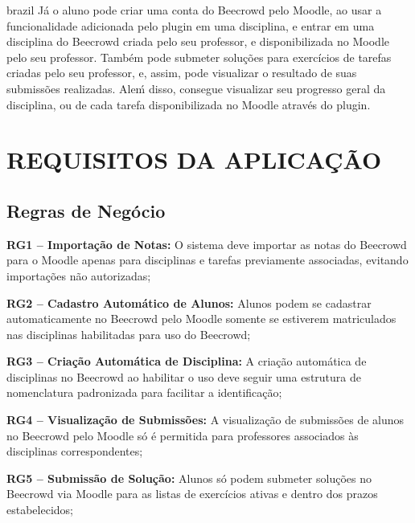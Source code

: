 \begin{otherlanguage*}{brazil}
    Já o aluno pode criar uma conta do Beecrowd pelo Moodle, ao usar a funcionalidade adicionada pelo plugin em uma disciplina, e entrar em uma disciplina do Beecrowd criada pelo seu professor, e disponibilizada no Moodle pelo seu professor. Também pode submeter soluções para exercícios de tarefas criadas pelo seu professor, e, assim, pode visualizar o resultado de suas submissões realizadas. Aleḿ disso, consegue visualizar seu progresso geral da disciplina, ou de cada tarefa disponibilizada no Moodle através do plugin.

    \section{REQUISITOS DA APLICAÇÃO}

    \subsection{Regras de Negócio}

    \textbf{RG1 – Importação de Notas:} O sistema deve importar as notas do Beecrowd para o Moodle apenas para disciplinas e tarefas previamente associadas, evitando importações não autorizadas;

    \vspace{12pt}

    \textbf{RG2 – Cadastro Automático de Alunos:} Alunos podem se cadastrar automaticamente no Beecrowd pelo Moodle somente se estiverem matriculados nas disciplinas habilitadas para uso do Beecrowd;

    \vspace{12pt}

    \textbf{RG3 – Criação Automática de Disciplina:} A criação automática de disciplinas no Beecrowd ao habilitar o uso deve seguir uma estrutura de nomenclatura padronizada para facilitar a identificação;

    \vspace{12pt}

    \textbf{RG4 – Visualização de Submissões:} A visualização de submissões de alunos no Beecrowd pelo Moodle só é permitida para professores associados às disciplinas correspondentes;

    \vspace{12pt}

    \textbf{RG5 – Submissão de Solução:} Alunos só podem submeter soluções no Beecrowd via Moodle para as listas de exercícios ativas e dentro dos prazos estabelecidos;

    \vspace{12pt}


\end{otherlanguage*}

